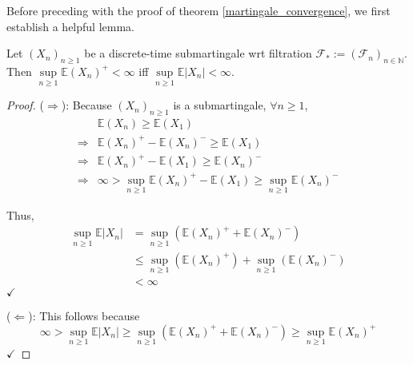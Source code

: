 Before preceding with the proof of theorem \ref{martingale_convergence}, we first establish a helpful lemma.

\begin{lemma}
    \label{submartingale_moments}
    Let $(X_{n})_{n \geq 1}$ be a discrete-time submartingale wrt filtration $\mathcal{F}_{*} := (\mathcal{F}_{n})_{n \in \mathbb{N}}$. Then $\sup\limits_{n \geq 1} \mathbb{E}(X_{n})^{+} < \infty$ iff $\sup\limits_{n \geq 1} \mathbb{E}|X_{n}| < \infty$.
\end{lemma}

\begin{proof}
    ($\Rightarrow$): Because $(X_{n})_{n \geq 1}$ is a submartingale, $\forall n \geq 1$,
    \begin{align*}
        &\mathbb{E}(X_{n}) \geq \mathbb{E}(X_{1})\\
        \Rightarrow&\mathbb{E}(X_{n})^{+} - \mathbb{E}(X_{n})^{-} \geq \mathbb{E}(X_{1})\\
        \Rightarrow&\mathbb{E}(X_{n})^{+} - \mathbb{E}(X_{1}) \geq \mathbb{E}(X_{n})^{-} \\
        \Rightarrow&\infty > \sup\limits_{n \geq 1} \mathbb{E}(X_{n})^{+} - \mathbb{E}(X_{1}) \geq \sup\limits_{n \geq 1} \mathbb{E}(X_{n})^{-}
    \end{align*}

    Thus,
    \begin{align*}
        \sup\limits_{n \geq 1} \mathbb{E}|X_{n}| &= \sup\limits_{n \geq 1} (\mathbb{E}(X_{n})^{+} + \mathbb{E}(X_{n})^{-})\\
        &\leq \sup\limits_{n \geq 1} (\mathbb{E}(X_{n})^{+}) + \sup\limits_{n \geq 1} (\mathbb{E}(X_{n})^{-})\\
        &< \infty 
    \end{align*}
    $\checkmark$

    ($\Leftarrow$): This follows because
    $$\infty > \sup\limits_{n \geq 1} \mathbb{E}|X_{n}| \geq \sup\limits_{n \geq 1} (\mathbb{E}(X_{n})^{+} + \mathbb{E}(X_{n})^{-}) \geq \sup\limits_{n \geq 1} \mathbb{E}(X_{n})^{+}$$
    $\checkmark$
\end{proof}

